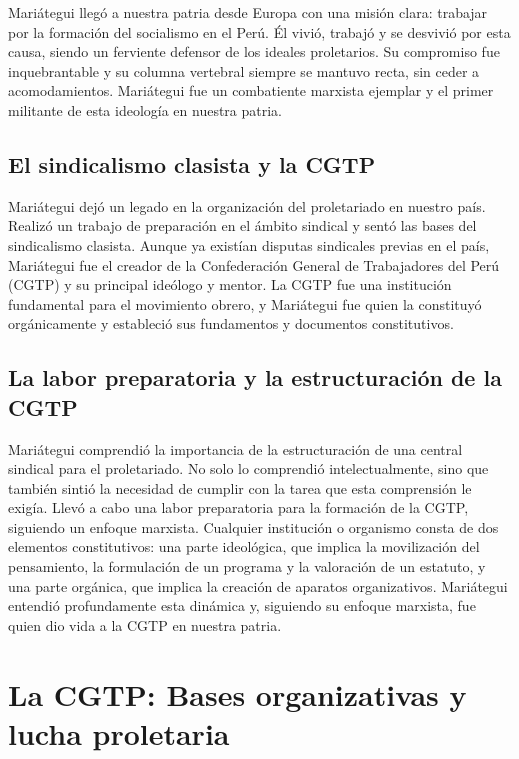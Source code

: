 \documentclass[
  a4paper,
]{article}
\begin{document}
Mariátegui llegó a nuestra patria desde Europa con una misión clara:
trabajar por la formación del socialismo en el Perú. Él vivió, trabajó y
se desvivió por esta causa, siendo un ferviente defensor de los ideales
proletarios. Su compromiso fue inquebrantable y su columna vertebral
siempre se mantuvo recta, sin ceder a acomodamientos. Mariátegui fue un
combatiente marxista ejemplar y el primer militante de esta ideología en
nuestra patria.

\hypertarget{el-sindicalismo-clasista-y-la-cgtp}{%
\subsection{El sindicalismo clasista y la
CGTP}\label{el-sindicalismo-clasista-y-la-cgtp}}

Mariátegui dejó un legado en la organización del proletariado en nuestro
país. Realizó un trabajo de preparación en el ámbito sindical y sentó
las bases del sindicalismo clasista. Aunque ya existían disputas
sindicales previas en el país, Mariátegui fue el creador de la
Confederación General de Trabajadores del Perú (CGTP) y su principal
ideólogo y mentor. La CGTP fue una institución fundamental para el
movimiento obrero, y Mariátegui fue quien la constituyó orgánicamente y
estableció sus fundamentos y documentos constitutivos.

\hypertarget{la-labor-preparatoria-y-la-estructuraciuxf3n-de-la-cgtp}{%
\subsection{La labor preparatoria y la estructuración de la
CGTP}\label{la-labor-preparatoria-y-la-estructuraciuxf3n-de-la-cgtp}}

Mariátegui comprendió la importancia de la estructuración de una central
sindical para el proletariado. No solo lo comprendió intelectualmente,
sino que también sintió la necesidad de cumplir con la tarea que esta
comprensión le exigía. Llevó a cabo una labor preparatoria para la
formación de la CGTP, siguiendo un enfoque marxista. Cualquier
institución o organismo consta de dos elementos constitutivos: una parte
ideológica, que implica la movilización del pensamiento, la formulación
de un programa y la valoración de un estatuto, y una parte orgánica, que
implica la creación de aparatos organizativos. Mariátegui entendió
profundamente esta dinámica y, siguiendo su enfoque marxista, fue quien
dio vida a la CGTP en nuestra patria.

\hypertarget{la-cgtp-bases-organizativas-y-lucha-proletaria}{%
\section{La CGTP: Bases organizativas y lucha
proletaria}\label{la-cgtp-bases-organizativas-y-lucha-proletaria}}
\end{document}
